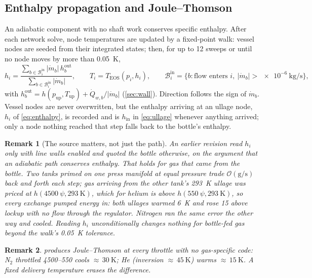 \documentclass[11pt,a4paper]{article}
\newtheorem{remark}{Remark}
\newcommand{\mdot}{\dot{m}}
\newcommand{\Qdot}{\dot{Q}}
\begin{document}
\subsection{Enthalpy propagation and Joule--Thomson}
An adiabatic component with no shaft work conserves specific enthalpy. After
each network solve, node temperatures are updated by a fixed-point walk:
vessel nodes are seeded from their integrated states; then, for up to 12 sweeps
or until no node moves by more than \SI{0.05}{\kelvin},
\begin{equation}
  h_i = \frac{\sum_{b\in\mathcal{B}^{\mathrm{in}}_i}|\mdot_b|\,h_b^{\mathrm{out}}}{\sum_{b\in\mathcal{B}^{\mathrm{in}}_i}|\mdot_b|},
  \qquad
  T_i = T_{\mathrm{EOS}}(p_i,h_i),
  \qquad
  \mathcal{B}^{\mathrm{in}}_i = \{b: \text{flow enters } i,\ |\mdot_b|>\SI{e-6}{\kilogram\per\second}\},
  \label{eq:enthalpy}
\end{equation}
with $h_b^{\mathrm{out}} = h(p_{\mathrm{up}},T_{\mathrm{up}}) + \Qdot_{w,b}/|\mdot_b|$
(\cref{sec:wall}). Direction follows the sign of $\mdot_b$. Vessel nodes are
never overwritten, but the enthalpy arriving at an ullage node, $h_i$ of
\cref{eq:enthalpy}, is recorded and is $h_{\mathrm{in}}$ in \cref{eq:ullage}
whenever anything arrived; only a node nothing reached that step falls back to
the bottle's enthalpy.
\begin{remark}[The source matters, not just the path]
An earlier revision read $h_i$ only with line walls enabled and quoted the
bottle otherwise, on the argument that an adiabatic path conserves enthalpy.
That holds for gas that \emph{came from the bottle}. Two tanks primed on one
press manifold at equal pressure trade $\mathcal{O}(\si{\gram\per\second})$
back and forth each step; gas arriving from the other tank's \SI{293}{\kelvin}
ullage was priced at $h(\SI{4500}{\psi},\SI{293}{\kelvin})$, which for helium
is \emph{above} $h(\SI{550}{\psi},\SI{293}{\kelvin})$, so every exchange pumped
energy in: both ullages warmed \SI{6}{\kelvin} and rose \SI{15}{\psi} above
lockup with no flow through the regulator. Nitrogen ran the same error the
other way and cooled. Reading $h_i$ unconditionally changes nothing for
bottle-fed gas beyond the walk's \SI{0.05}{\kelvin} tolerance.
\end{remark}
\begin{remark}
 produces Joule--Thomson at every throttle with no
gas-specific code: N$_2$ throttled \SIrange{4500}{550}{\psi} cools
${\approx}\,\SI{30}{\kelvin}$; He (inversion ${\approx}\,\SI{45}{\kelvin}$) warms
${\approx}\,\SI{15}{\kelvin}$. A fixed delivery temperature erases the difference.
\end{remark}
\end{document}
